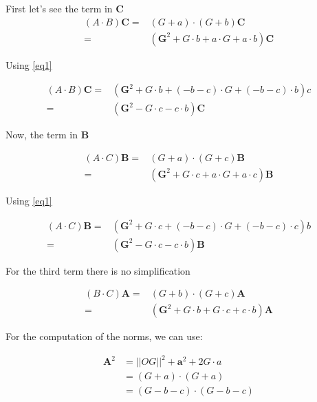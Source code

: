 \documentclass[10pt,a4paper]{article}
\begin{document}
First let's see the term in $\mathbf{C}$
\begin{align*}
 \left({A}\cdot {B}\right)\mathbf{C}
	=& \left( G + a \right) \cdot \left( G + b \right) \mathbf{C} \\
	 =& (\mathbf{G}^2 +  G \cdot b	+ a \cdot G + a \cdot b    ) \mathbf{C}
\end{align*}

Using \eqref{eq1}

\begin{align}
 \left({A}\cdot {B}\right)\mathbf{C}
	 =& (\mathbf{G}^2 +  G \cdot b	+ (-b - c) \cdot G + (-b - c) \cdot b    ) c \nonumber \\
	 =& (\mathbf{G}^2 - G \cdot c - c \cdot b)\mathbf{C}
\end{align}



Now, the term in $\mathbf{B}$


\begin{align*}
 \left({A}\cdot {C}\right)\mathbf{B} 
	=& \left( G + a \right) \cdot \left( G + c \right) \mathbf{B} \\
	 =& (\mathbf{G}^2 +  G \cdot c	+ a \cdot G + a \cdot c    ) \mathbf{B}
\end{align*}

Using \eqref{eq1}

\begin{align}
 \left({A}\cdot {C}\right)\mathbf{B}
	 =& (\mathbf{G}^2 +  G \cdot c	+ (-b - c) \cdot G + (-b - c) \cdot c    ) b \nonumber \\
	 =& (\mathbf{G}^2 - G \cdot c - c \cdot b)\mathbf{B}
\end{align}


For the third term there is no simplification

\begin{align}
 \left({B}\cdot {C}\right)\mathbf{A}
	=& \left( G + b \right) \cdot \left( G + c \right) \mathbf{A}\\
	=& (\mathbf{G}^2 + G \cdot b + G \cdot c + c \cdot b)\mathbf{A}
\end{align}


For the computation of the norms, we can use:

\begin{align*}
\mathbf{A}^2 &= ||OG||^2 + \mathbf{a}^2 + 2 G \cdot a \\
        &=   (G+a) \cdot (G+a) \\
        &=   (G-b-c) \cdot (G-b-c) \\
\end{align*}
\end{document}
